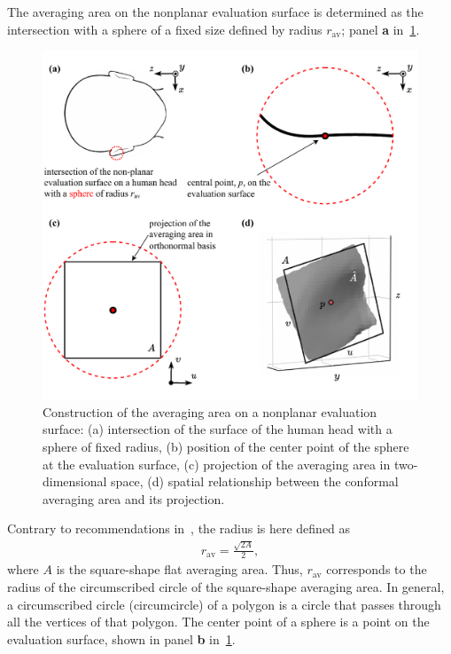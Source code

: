 The averaging area on the nonplanar evaluation surface is determined as the intersection with a sphere of a fixed size defined by radius $r_\text{av}$; panel \textbf{a} in~\cref{fig:evaluation_surface}.
\begin{figure}[t]
    \centering
    \includegraphics[width=\textwidth]{artwork/evaluation_surface.pdf}
    \caption{Construction of the averaging area on a nonplanar evaluation surface: (a) intersection of the surface of the human head with a sphere of fixed radius, (b) position of the center point of the sphere at the evaluation surface, (c) projection of the averaging area in two-dimensional space, (d) spatial relationship between the conformal averaging area and its projection.}
    \label{fig:evaluation_surface}
\end{figure}
Contrary to recommendations in~\cite{IEC63195-2-2022}, the radius is here defined as
\begin{align}
    r_\text{av} = \frac{\sqrt{2 A}}{2},
\end{align}
where $A$ is the square-shape flat averaging area.
Thus, $r_\text{av}$ corresponds to the radius of the circumscribed circle of the square-shape averaging area.
In general, a circumscribed circle (circumcircle) of a polygon is a circle that passes through all the vertices of that polygon.
The center point of a sphere is a point on the evaluation surface, shown in panel \textbf{b} in~\cref{fig:evaluation_surface}.

